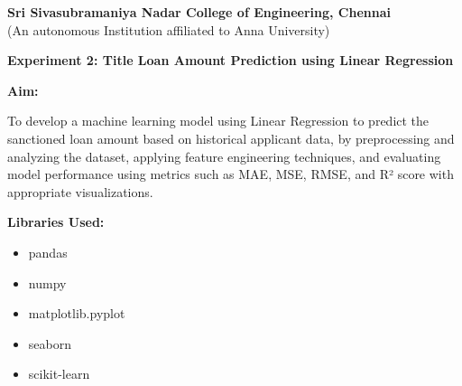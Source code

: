 \documentclass[11pt]{article}
\begin{document}
\begin{center}
    \large \textbf{Sri Sivasubramaniya Nadar College of Engineering, Chennai} \\
    (An autonomous Institution affiliated to Anna University) \\
    \vspace{0.3cm}
\end{center}
\begin{table}[!h]
\renewcommand{\arraystretch}{1.5}
\end{table}
\begin{center}
 \textbf{Experiment  2: Title Loan Amount Prediction using Linear Regression}
\end{center}
\textbf{Aim:}

\vspace{0.5cm}
\noindent
To develop a machine learning model using Linear Regression to predict the sanctioned loan amount based on historical applicant data, by preprocessing and analyzing the dataset, applying feature engineering techniques, and evaluating model performance using metrics such as MAE, MSE, RMSE, and R² score with appropriate visualizations.

\vspace{0.5cm}
\noindent
\textbf{\large Libraries Used:}

\begin{itemize}
  \item pandas
  \item numpy
  \item matplotlib.pyplot
  \item seaborn
  \item scikit-learn
\end{itemize}
\end{document}
